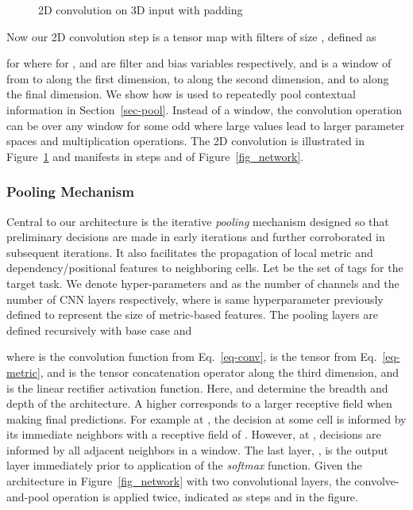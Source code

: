 \documentclass{clv3}
\newcommand*\circled[1]{\tikz[baseline=(char.base)]{
            \node[shape=circle,draw,inner sep=1pt] (char) {#1};}}
\begin{document}
\begin{figure}[t]
  \caption{2D convolution on 3D input with padding}
  \label{fig_2d_conv}
\end{figure}

Now our 2D convolution step is a tensor map   with  filters of size , defined as  

for  where  for , and  are filter and bias variables respectively, and  is a  window of  from  to  along the first dimension,  to  along the second dimension, and  to  along the final dimension. We show how  is used to repeatedly pool contextual information in Section~\ref{sec-pool}. Instead of a  window, the convolution operation can be over any   window for some odd  where large  values lead to larger parameter spaces and multiplication operations. The 2D convolution is illustrated in Figure~\ref{fig_2d_conv} and manifests in steps \circled{5} and \circled{7} of Figure~\ref{fig_network}. 

\subsubsection{Pooling Mechanism}\label{sec-pooling}
\label{sec-pool}
Central to our architecture is the iterative \emph{pooling} mechanism designed so that preliminary decisions are made in early iterations and further corroborated in subsequent iterations. It also facilitates the propagation of local metric and dependency/positional features to neighboring cells. Let  be the set of tags for the target task. We denote hyper-parameters  and  as the number of channels and the number of CNN layers respectively, where  is same hyperparameter previously defined to represent the size of metric-based features. 
 The pooling layers are defined recursively with base case  and

where  is the convolution function from Eq.~\eqref{eq-conv},  is the tensor from Eq.~\eqref{eq-metric}, and  is the tensor concatenation operator along the third dimension, and  is the linear rectifier activation function. Here,  and  determine the breadth and depth of the architecture. A higher   corresponds to a larger receptive field when making final predictions. For example at , the decision at some cell is informed by its immediate neighbors with a receptive field of . However, at , decisions are informed by all adjacent neighbors in a  window. 
The last layer, , is the output layer immediately prior to application of the \textit{softmax} function.
Given the architecture in Figure~\ref{fig_network} with two convolutional layers, the convolve-and-pool operation is applied twice, indicated as steps  \circled{5} and \circled{7} in the figure. 
\end{document}
